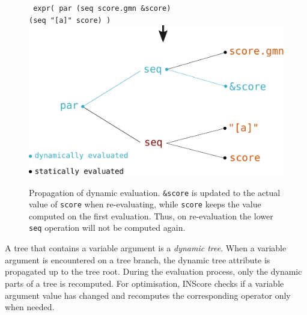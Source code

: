 \documentclass{article}
\newcommand{\OSC}[1]{{\fontsize{10pt}{10pt} \selectfont\texttt{#1}}}
\newcommand{\oper}[1]{\textcolor{figRed}{#1}}
\newcommand{\param}[1]{\textcolor{figOrange}{#1}}
\newcommand{\prefix}[1]{\textcolor{figBlue}{#1}}
\newcommand{\tab}{\hspace*{4mm}}
\begin{document}
\begin{figure}[th]
\centering
\OSC{ expr( \oper{par} (\oper{seq} \param{score.gmn} \prefix{\&}\param{score}) \\
 \tab\tab\tab\tab (\oper{seq} \param{"[a]" score}) )}
\includegraphics[width=0.9\columnwidth]{imgs/dynamicEval}
\caption{Propagation of dynamic evaluation. \OSC{\prefix{\&}\param{score}} is updated to the actual value of \OSC{score} when re-evaluating, while \OSC{\param{score}} keeps the value computed on the first evaluation. Thus, on re-evaluation the lower \OSC{\oper{seq}} operation will not be computed again. 
\label{fig:dynamicEval}}
\end{figure}

A tree that contains a variable argument is a \emph{dynamic tree}. When a variable argument is encountered on a tree branch, the dynamic tree attribute is propagated up to the tree root. During the evaluation process, only the dynamic parts of a tree is recomputed. For optimisation, INScore checks if a variable argument value has changed and recomputes the corresponding operator only when needed.


\end{document}

